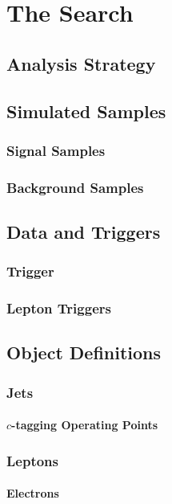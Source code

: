 \chapter{The \sctoc Search}

\section{Analysis Strategy}

\section{Simulated Samples}
\subsection{Signal Samples}
\subsection{Background Samples}

\section{Data and Triggers}
\subsection{\met Trigger}
\subsection{Lepton Triggers}

\section{Object Definitions}
\subsection{Jets}
\subsubsection{$c$-tagging Operating Points}
\subsection{Leptons}
\subsubsection{Electrons}
